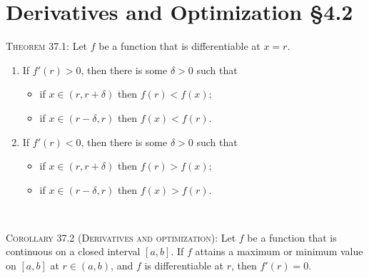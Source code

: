 \documentclass[12pt]{amsart}
\begin{document}
	
	
	\thispagestyle{empty}
	
	
	\section*{Derivatives and Optimization \S4.2}
	

\begin{framed} 
 \noindent \textsc{Theorem 37.1:} Let $f$ be a function that is differentiable at $x=r$.
 \begin{enumerate}
 \item 
 If $f'(r) > 0$, then there is some $\delta>0$ such that 
 \begin{itemize}
 \item if $x\in (r,r+\delta)$ then $f(r) < f(x)$;
  \item if $x\in (r-\delta,r)$ then $f(x) < f(r)$.
  \end{itemize}
  
  \item  If $f'(r) < 0$, then there is some $\delta>0$ such that 
  \begin{itemize}
 \item if $x\in (r,r+\delta)$ then $f(r) > f(x)$;
 \item if $x\in (r-\delta,r)$ then $f(x) > f(r)$.
  \end{itemize}
  \end{enumerate}
  
  \
  
  \noindent \textsc{Corollary 37.2 (Derivatives and optimization):}
  Let $f$ be a function that is continuous on a closed interval $[a,b]$. If $f$ attains a maximum or minimum value on $[a,b]$ at $r\in (a,b)$, and $f$ is differentiable at $r$, then $f'(r)=0$.
 \end{framed}


\
\end{document}
